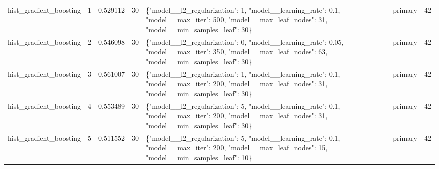 \begin{tabular}{lrrrllr}
hist\_gradient\_boosting & 1 & 0.529112 & 30 & \{"model\_\_l2\_regularization": 1, "model\_\_learning\_rate": 0.1, "model\_\_max\_iter": 500, "model\_\_max\_leaf\_nodes": 31, "model\_\_min\_samples\_leaf": 30\} & primary & 42 \\
hist\_gradient\_boosting & 2 & 0.546098 & 30 & \{"model\_\_l2\_regularization": 0, "model\_\_learning\_rate": 0.05, "model\_\_max\_iter": 350, "model\_\_max\_leaf\_nodes": 63, "model\_\_min\_samples\_leaf": 30\} & primary & 42 \\
hist\_gradient\_boosting & 3 & 0.561007 & 30 & \{"model\_\_l2\_regularization": 1, "model\_\_learning\_rate": 0.1, "model\_\_max\_iter": 200, "model\_\_max\_leaf\_nodes": 31, "model\_\_min\_samples\_leaf": 30\} & primary & 42 \\
hist\_gradient\_boosting & 4 & 0.553489 & 30 & \{"model\_\_l2\_regularization": 5, "model\_\_learning\_rate": 0.1, "model\_\_max\_iter": 200, "model\_\_max\_leaf\_nodes": 31, "model\_\_min\_samples\_leaf": 30\} & primary & 42 \\
hist\_gradient\_boosting & 5 & 0.511552 & 30 & \{"model\_\_l2\_regularization": 5, "model\_\_learning\_rate": 0.1, "model\_\_max\_iter": 200, "model\_\_max\_leaf\_nodes": 15, "model\_\_min\_samples\_leaf": 10\} & primary & 42 \\
\bottomrule
\end{tabular}
